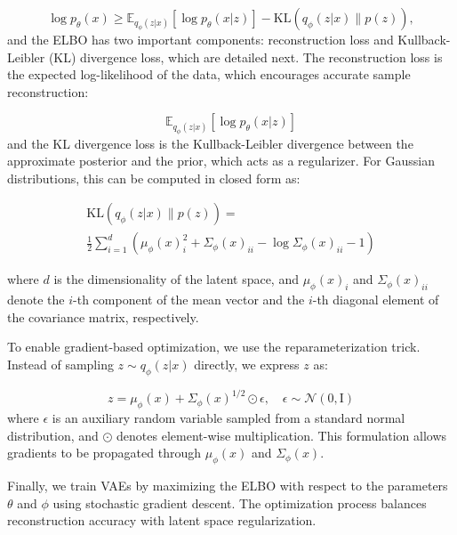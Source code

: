 \documentclass{ieeeaccess}
\begin{document}
\begin{equation}
\log p_\theta(x) \geq \mathbb{E}_{q_\phi(z | x)} \left[ \log p_\theta(x | z) \right] - \text{KL}(q_\phi(z | x) \parallel p(z)),
\end{equation}
and the ELBO has two important components: reconstruction loss and Kullback-Leibler (KL) divergence loss, which are detailed next. The reconstruction loss is the expected log-likelihood of the data, which encourages accurate sample reconstruction:

\begin{equation}
\mathbb{E}_{q_\phi(z | x)} \left[ \log p_\theta(x | z) \right]
\end{equation}
and the KL divergence loss is the Kullback-Leibler divergence between the approximate posterior and the prior, which acts as a regularizer. For Gaussian distributions, this can be computed in closed form as:

\begin{equation}
\begin{aligned}
\text{KL}(q_\phi(z | x) \parallel p(z))
=  \\
\frac{1}{2} \sum_{i=1}^{d} \left( \mu_\phi(x)_i^2 + \Sigma_\phi(x)_{ii} - \log \Sigma_\phi(x)_{ii} - 1 \right)
\end{aligned}
\end{equation}

where $d$ is the dimensionality of the latent space, and $\mu_\phi(x)_i$ and $\Sigma_\phi(x)_{ii}$ denote the $i$-th component of the mean vector and the $i$-th diagonal element of the covariance matrix, respectively.

To enable gradient-based optimization, we use the reparameterization trick. Instead of sampling $z \sim q_\phi(z | x)$ directly, we express $z$ as:

\begin{equation}
z = \mu_\phi(x) + \Sigma_\phi(x)^{1/2} \odot \epsilon, \quad \epsilon \sim \mathcal{N}(0, \mathrm{I})
\end{equation}
where $\epsilon$ is an auxiliary random variable sampled from a standard normal distribution, and $\odot$ denotes element-wise multiplication. This formulation allows gradients to be propagated through $\mu_\phi(x)$ and $\Sigma_\phi(x)$.

Finally, we train VAEs by maximizing the ELBO with respect to the parameters $\theta$ and $\phi$ using stochastic gradient descent. The optimization process balances reconstruction accuracy with latent space regularization.
\end{document}
